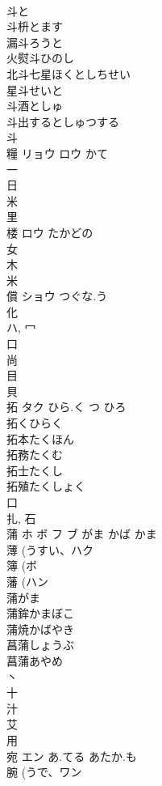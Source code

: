 \documentclass[8pt]{extreport}
\begin{document}
\begin{CJK}{UTF8}{min}
\\	斗と 
\\	斗枡とます 
\\	漏斗ろうと 
\\	火熨斗ひのし 
\\	北斗七星ほくとしちせい 
\\	星斗せいと 
\\	斗酒としゅ 
\\	斗出するとしゅつする 
\\	斗 
\\	糧	リョウ ロウ	かて	
\\	一 
\\	日 
\\	米 
\\	里 
\\	楼	ロウ	たかどの	
\\	女 
\\	木 
\\	米 
\\	償	ショウ	つぐな.う	
\\	化 
\\	ハ, 冖 
\\	口 
\\	尚 
\\	目 
\\	貝 
\\	拓	タク	ひら.く つ ひろ	
\\	拓くひらく 
\\	拓本たくほん 
\\	拓務たくむ 
\\	拓士たくし 
\\	拓殖たくしょく 
\\	口 
\\	扎, 石 
\\	蒲	ホ ボ フ ブ	がま かば かま	
\\	薄 (うすい、ハク 
\\	簿 (ボ 
\\	藩 (ハン 
\\	蒲がま 
\\	蒲鉾かまぼこ 
\\	蒲焼かばやき 
\\	菖蒲しょうぶ 
\\	菖蒲あやめ 
\\	丶 
\\	十 
\\	汁 
\\	艾 
\\	用 
\\	宛	エン	あ.てる あたか.も	
\\	腕 (うで、ワン 

\end{CJK}
\end{document}
